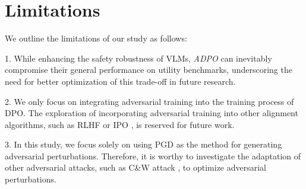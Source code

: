 \section*{Limitations}
We outline the limitations of our study as follows: 

1. While enhancing the safety robustness of VLMs, \textit{ADPO} can inevitably compromise their general performance on utility benchmarks, underscoring the need for better optimization of this trade-off in future research. 

2. We only focus on integrating adversarial training into the training process of DPO. The exploration of incorporating adversarial training into other alignment algorithms, such as RLHF or IPO \cite{IPO}, is reserved for future work.

3. In this study, we focus solely on using PGD as the method for generating adversarial perturbations. Therefore, it is worthy to investigate the adaptation of other adversarial attacks, such as C\&W attack \cite{carlini2017towards}, to optimize adversarial perturbations.
